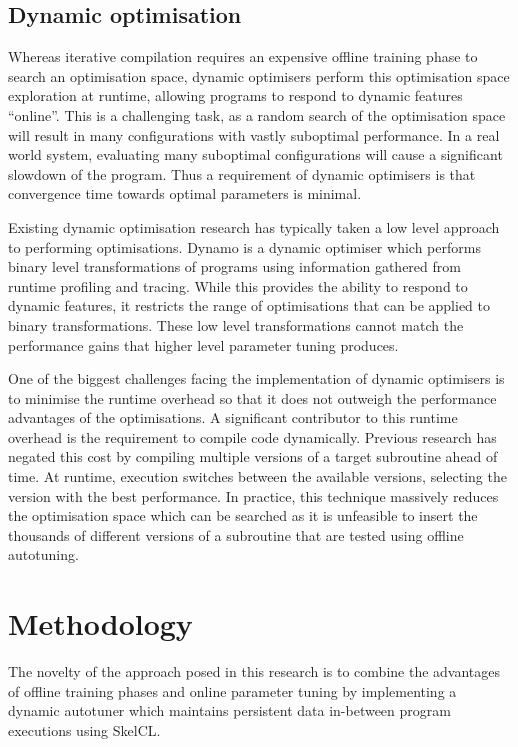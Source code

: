 \subsection{Dynamic optimisation}
Whereas iterative compilation requires an expensive offline training
phase to search an optimisation space, dynamic optimisers perform this
optimisation space exploration at runtime, allowing programs to
respond to dynamic features ``online''. This is a challenging task, as
a random search of the optimisation space will result in many
configurations with vastly suboptimal performance. In a real world
system, evaluating many suboptimal configurations will cause a
significant slowdown of the program. Thus a requirement of dynamic
optimisers is that convergence time towards optimal parameters is
minimal.

Existing dynamic optimisation research has typically taken a low level
approach to performing optimisations. Dynamo is a dynamic optimiser
which performs binary level transformations of programs using
information gathered from runtime profiling and tracing. While this
provides the ability to respond to dynamic features, it restricts the
range of optimisations that can be applied to binary
transformations. These low level transformations cannot match the
performance gains that higher level parameter tuning produces.

One of the biggest challenges facing the implementation of dynamic
optimisers is to minimise the runtime overhead so that it does not
outweigh the performance advantages of the optimisations. A
significant contributor to this runtime overhead is the requirement to
compile code dynamically. Previous research has negated this cost by
compiling multiple versions of a target subroutine ahead of time. At
runtime, execution switches between the available versions, selecting
the version with the best performance. In practice, this technique
massively reduces the optimisation space which can be searched as it
is unfeasible to insert the thousands of different versions of a
subroutine that are tested using offline autotuning.

\section{Methodology}

The novelty of the approach posed in this research is to combine the
advantages of offline training phases and online parameter tuning by
implementing a dynamic autotuner which maintains persistent data
in-between program executions using SkelCL.

